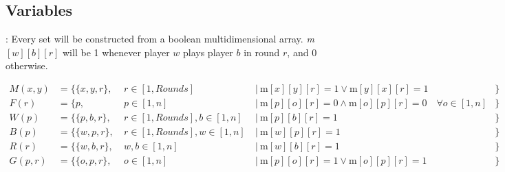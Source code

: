 \documentclass[9pt, aspectratio=169, xcolor=table]{beamer}
\begin{document}
\subsection{Variables}
\begin{frame}{\secname: \subsecname}
    Every set will be constructed from a boolean multidimensional array. \textit{m}$[w][b][r]$ will be 1 whenever player $w$ plays player $b$ in round $r$, and 0 otherwise.
    \begin{tcolorbox}[colback=gray!30, colframe=Veronablue, arc=0pt, outer arc=0pt, title = \textbf{Set constructions}]
	\begin{align*}
	    M(x, y)   &= \{\{x, y, r\}, &\ r \in [1, Rounds]              \ &| \ \text{m}[x][y][r] = 1 \lor \text{m}[y][x][r] = 1                         &\}\\
	    F(r)      &= \{p          , &\ p \in [1, n]                   \ &| \ \text{m}[p][o][r] = 0 \land \text{m}[o][p][r] = 0  \quad \forall o \in [1, n]&\}\\
	    W(p)      &= \{\{p, b, r\}, &\ r \in [1, Rounds], b \in [1, n]\ &| \ \text{m}[p][b][r] = 1                                                    &\}\\
	    B(p)      &= \{\{w, p, r\}, &\ r \in [1, Rounds], w \in [1, n]\ &| \ \text{m}[w][p][r] = 1                                                    &\}\\
	    R(r)      &= \{\{w, b, r\}, &\ w, b \in [1, n]                \ &| \ \text{m}[w][b][r] = 1                                                    &\}\\
	    G(p, r)   &= \{\{o, p, r\}, &\ o \in [1, n]                   \ &| \ \text{m}[p][o][r] = 1  \lor \text{m}[o][p][r] = 1                        &\}\\
	\end{align*}
    \end{tcolorbox}
\end{frame}
\end{document}
